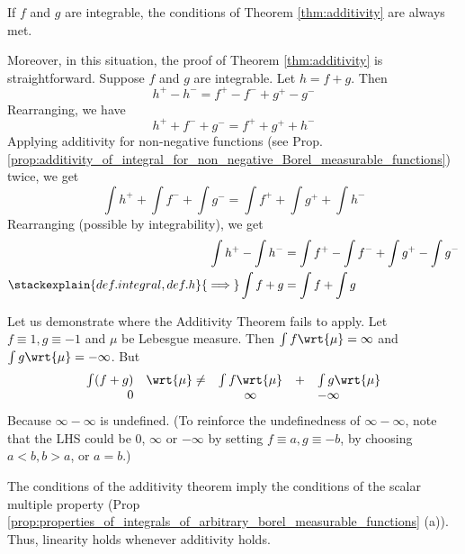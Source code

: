 \documentclass{article} %
\newcommand{\dmu}{\wrt{\mu}}
\begin{document}
\begin{remark}{}
If $f$ and $g$ are integrable, the conditions of Theorem \ref{thm:additivity} are always met.    

Moreover, in this situation, the proof of Theorem \ref{thm:additivity} is straightforward. Suppose $f$ and $g$ are integrable. Let $h=f+g$.  Then 
\[ h^+ - h^- = f^+ - f^- + g^+ - g^- \]
Rearranging, we have 
\[ h^+ + f^- + g^- = f^+ + g^+ + h^- \]
Applying additivity for non-negative functions (see Prop. \ref{prop:additivity_of_integral_for_non_negative_Borel_measurable_functions}) twice, we get 
\[ \int h^+ + \int f^- + \int g^- =  \int f^+ + \int g^+ + \int h^- \]
Rearranging (possible by integrability), we get 
\begin{align*} 
\int h^+ -  \int h^- &=  \int f^+ - \int f^- + \int g^+ - \int g^- \\
\stackexplain{def. integral, def. h}{\implies} \int f+g &= \int f + \int g 
\end{align*}
\label{rk:additivity_holds_automatically_for_integrable_functions}	
\end{remark}

\begin{non-example}
Let us demonstrate where the Additivity Theorem fails to apply.  Let $f \equiv 1, g \equiv -1$ and $\mu$ be Lebesgue measure.  Then $\int f \dmu = \infty$ and $\int  g \dmu = -\infty$.  But
\[\begin{array}{rcccl}
\int (f+g) &\dmu  \neq &  \int f \dmu & + & \int g \dmu   \\
	0 && \infty && -\infty 
\end{array} \]
Because $\infty - \infty$ is undefined. {\tiny (To reinforce the undefinedness of  $\infty - \infty$, note that the LHS could be $0$, $\infty$ or $-\infty$ by setting $f \equiv a, g \equiv -b$, by choosing $a<b, b>a$, or $a=b$.) }
\end{non-example}


\begin{remark}{}
The conditions of the additivity theorem imply the conditions of the scalar multiple property (Prop \ref{prop:properties_of_integrals_of_arbitrary_borel_measurable_functions} (a)).  Thus, linearity holds whenever additivity holds.
\label{rk:linearity_holds_if_additivity_holds}	
\end{remark}
\end{document}
